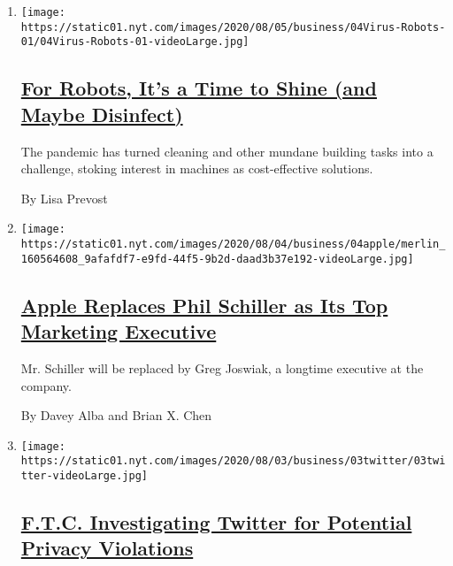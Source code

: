 \begin{enumerate}
\def\labelenumi{\arabic{enumi}.}
\item
  \texttt{[image: https://static01.nyt.com/images/2020/08/05/business/04Virus-Robots-01/04Virus-Robots-01-videoLarge.jpg]}

  \hypertarget{for-robots-its-a-time-to-shine-and-maybe-disinfect}{%
  \subsection{\texorpdfstring{\href{/2020/08/04/business/robot-cleaning-coronavirus.html}{For
  Robots, It's a Time to Shine (and Maybe
  Disinfect)}}{For Robots, It's a Time to Shine (and Maybe Disinfect)}}\label{for-robots-its-a-time-to-shine-and-maybe-disinfect}}

  The pandemic has turned cleaning and other mundane building tasks into
  a challenge, stoking interest in machines as cost-effective solutions.

  By Lisa Prevost
\item
  \texttt{[image: https://static01.nyt.com/images/2020/08/04/business/04apple/merlin\_160564608\_9afafdf7-e9fd-44f5-9b2d-daad3b37e192-videoLarge.jpg]}

  \hypertarget{apple-replaces-phil-schiller-as-its-top-marketing-executive}{%
  \subsection{\texorpdfstring{\href{/2020/08/04/technology/apple-schiller-marketing-executive-departure.html}{Apple
  Replaces Phil Schiller as Its Top Marketing
  Executive}}{Apple Replaces Phil Schiller as Its Top Marketing Executive}}\label{apple-replaces-phil-schiller-as-its-top-marketing-executive}}

  Mr. Schiller will be replaced by Greg Joswiak, a longtime executive at
  the company.

  By Davey Alba and Brian X. Chen
\item
  \texttt{[image: https://static01.nyt.com/images/2020/08/03/business/03twitter/03twitter-videoLarge.jpg]}

  \hypertarget{ftc-investigating-twitter-for-potential-privacy-violations}{%
  \subsection{\texorpdfstring{\href{/2020/08/03/technology/ftc-twitter-privacy-violations.html}{F.T.C.
  Investigating Twitter for Potential Privacy
  Violations}}{F.T.C. Investigating Twitter for Potential Privacy Violations}}\label{ftc-investigating-twitter-for-potential-privacy-violations}}


\end{enumerate}
